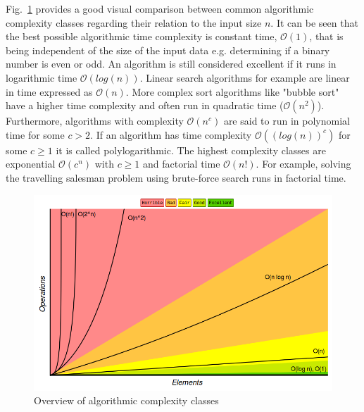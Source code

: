 Fig.~\ref{fig:algcomplexities2} provides a good visual comparison between common algorithmic complexity classes regarding their relation to the input size $n$. It can be seen that the best possible algorithmic time complexity is constant time, $\mathcal{O}(1)$, that is being independent of the size of the input data e.g. determining if a binary number is even or odd. An algorithm is still considered excellent if it runs in logarithmic time $\mathcal{O}(log(n))$. Linear search algorithms for example are linear in time expressed as $\mathcal{O}(n)$. More complex sort algorithms like "bubble sort" have a higher time complexity and often run in quadratic time ($\mathcal{O}(n^2)$). Furthermore, algorithms with complexity $\mathcal{O}(n^c)$ are said to run in polynomial time for some $c > 2$. If an algorithm has time complexity $\mathcal{O}((log(n))^c)$ for some $c \geq 1$ it is called polylogarithmic. The highest complexity classes are exponential $\mathcal{O}(c^n)$ with $c \geq 1$ and factorial time $\mathcal{O}(n!)$. For example, solving the travelling salesman problem using brute-force search runs in factorial time.

\begin{figure}[H]
      \centering
       \includegraphics[scale=0.25]{img/bigocomplexity.png}
       \caption[]{\label{fig:algcomplexities2} Overview of algorithmic complexity classes\footnotemark[6]}
\end{figure}

